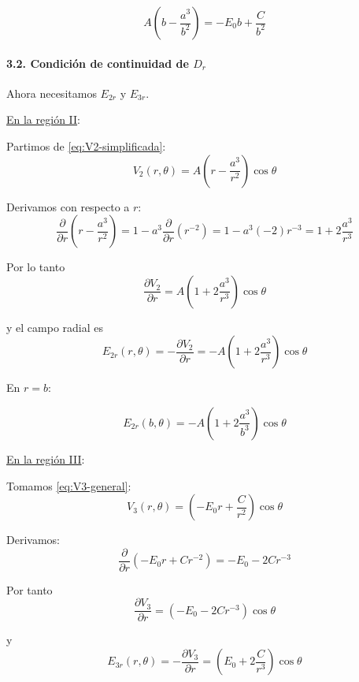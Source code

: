 \documentclass{article}
\begin{document}
\begin{equation}
A\left(b - \frac{a^{3}}{b^{2}}\right)
= -E_{0} b + \frac{C}{b^{2}}
\label{eq:cond-V-b}
\end{equation}

\paragraph{3.2. Condición de continuidad de $D_{r}$}

Ahora necesitamos $E_{2r}$ y $E_{3r}$.

\medskip

\underline{En la región II}:

Partimos de \eqref{eq:V2-simplificada}:
\[
V_{2}(r,\theta) = A\left(r - \frac{a^{3}}{r^{2}}\right)\cos\theta
\]

Derivamos con respecto a $r$:
\[
\frac{\partial}{\partial r}\left(r - \frac{a^{3}}{r^{2}}\right)
= 1 - a^{3}\frac{\partial}{\partial r}\left(r^{-2}\right)
= 1 - a^{3}(-2)r^{-3}
= 1 + 2\frac{a^{3}}{r^{3}}
\]

Por lo tanto
\[
\frac{\partial V_{2}}{\partial r}
= A\left(1 + 2\frac{a^{3}}{r^{3}}\right)\cos\theta
\]

y el campo radial es
\begin{equation}
E_{2r}(r,\theta) = -\frac{\partial V_{2}}{\partial r}
= -A\left(1 + 2\frac{a^{3}}{r^{3}}\right)\cos\theta
\label{eq:E2r-general}
\end{equation}

En $r=b$:

\begin{equation}
E_{2r}(b,\theta) = -A\left(1 + 2\frac{a^{3}}{b^{3}}\right)\cos\theta
\label{eq:E2r-b}
\end{equation}

\medskip

\underline{En la región III}:

Tomamos \eqref{eq:V3-general}:
\[
V_{3}(r,\theta) = \left(-E_{0} r + \frac{C}{r^{2}}\right)\cos\theta
\]

Derivamos:
\[
\frac{\partial}{\partial r}\left(-E_{0}r + C r^{-2}\right)
= -E_{0} - 2C r^{-3}
\]

Por tanto
\[
\frac{\partial V_{3}}{\partial r}
= \left(-E_{0} - 2C r^{-3}\right)\cos\theta
\]

y
\begin{equation}
E_{3r}(r,\theta) = -\frac{\partial V_{3}}{\partial r}
= \left(E_{0} + 2\frac{C}{r^{3}}\right)\cos\theta
\label{eq:E3r-general}
\end{equation}
\end{document}
